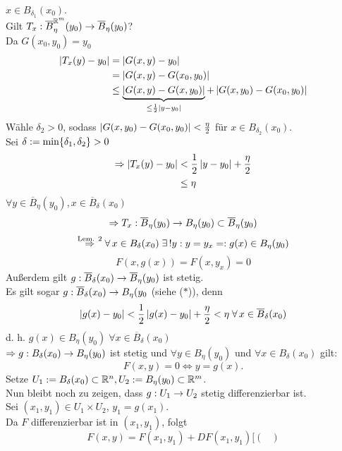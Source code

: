 \documentclass[../ana2.tex]{subfiles}
\begin{document}
\begin{bew}
    \(x \in B_{\delta_1}(x_0)\).\\
    Gilt \( T_x:\overline{B}_\eta^{\mathbb{R}^m} (y_0) \rightarrow \overline{B}_\eta(y_0) \)?\\
    Da \( G(x_0, y_0) = y_0 \)
    \begin{align*}
        \left| T_x(y) - y_0 \right| &= \left| G(x,y) - y_0 \right| \\
        &= \left| G(x,y) - G(x_0, y_0) \right| \\
        &\leq \underbrace{\left|G(x,y)-G(x,y_0)\right|}_{\leq \frac{1}{2}\left|y-y_0\right|} 
        + \left|G(x,y_0)-G(x_0,y_0)\right| 
    \end{align*}
    Wähle \(\delta_2 > 0\), sodass \(\left|G(x,y_0)-G(x_0,y_0)\right| < \frac{\eta}{2}\)
    für \(x \in B_{\delta_2}(x_0)\).\\
    Sei \(\delta := \min \{\delta_1, \delta_2\} > 0\)
    \begin{align*}
        \Rightarrow \left|T_x(y)-y_0\right| &< \frac{1}{2} \left|y-y_0\right| + \frac{\eta}{2}\\
        &\leq \eta
    \end{align*}
    \(\forall y \in \overline{B}_\eta(y_0), x \in \overline{B}_\delta(x_0)\)    
    \[ \Rightarrow  T_x : \overline{B}_\eta(y_0) \rightarrow B_\eta(y_0) 
    \subset \overline{B}_\eta(y_0) \]
    \[ \oversett{Lem. 2}{\Rightarrow} \forall x \in B_\delta(x_0) 
    \; \exists ! y : y = y_x =: g(x) \in B_\eta(y_0) \]
    \[ F(x,g(x)) = F(x,y_x) = 0 \]
    Außerdem gilt \( g:\overline{B}_\delta(x_0)\rightarrow \overline{B}_\eta(y_0) \) 
    ist stetig. \\
    Es gilt sogar \(g:\overline{B}_\delta(x_0)\rightarrow B_\eta(y_0\) (siehe (\(*\))),
    denn 
    \[ \abs{g(x)-y_0} < \frac{1}{2}\abs{g(x)-y_0}+ \frac{\eta}{2} < \eta 
    \; \forall x \in \overline{B}_\delta(x_0) \]
    d. h. \(g(x) \in B_\eta(y_0) \; \forall x \in \overline{B}_\delta(x_0)\)\\
    \( \Rightarrow  g :B_\delta(x_0)\rightarrow B_\eta(y_0) \) ist stetig 
    und \( \forall y \in B_\eta(y_0) \) und \( \forall x \in B_\delta(x_0) \) 
    gilt: 
    \[ F(x,y) = 0 \Leftrightarrow y = g(x). \]
    Setze \(U_1 := B_\delta(x_0) \subset \mathbb{R}^n, U_2 := B_\eta(y_0) \subset \mathbb{R}^m\).\\
    Nun bleibt noch zu zeigen, dass 
    \( g:U_1\rightarrow U_2 \) stetig differenzierbar ist.\\
    Sei \( (x_1, y_1) \in U_1 \times U_2 \), \( y_1 = g(x_1) \).\\
    Da \(F\) differenzierbar ist in \( (x_1, y_1) \), folgt 
    \[ F(x,y) = F(x_1, y_1) + DF(x_1, y_1)[\begin{pmatrix}

\end{pmatrix}\]
\end{bew}
\end{document}
